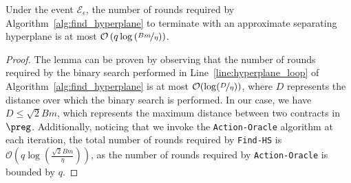 \begin{lemma}\label{lem:rounds_hyperplane}
	Under the event $\mathcal{E}_\epsilon$, the number of rounds required by Algorithm~\ref{alg:find_hyperplane} to terminate with an approximate separating hyperplane is at most $\mathcal{O}\left(q \log \left(\nicefrac{Bm}{\eta}\right)\right)$.
\end{lemma}
%
\begin{proof}
	The lemma can be proven by observing that the number of rounds required by the binary search performed in Line~\ref{line:hyperplane_loop} of Algorithm~\ref{alg:find_hyperplane} is at most $\mathcal{O}(\log(\nicefrac{D}{\eta}))$, where $D$ represents the distance over which the binary search is performed. In our case, we have $D \leq \sqrt{2}Bm$, which represents the maximum distance between two contracts in $\preg$. Additionally, noticing that we invoke the \texttt{Action-Oracle} algorithm at each iteration, the total number of rounds required by \texttt{Find-HS} is $\mathcal{O}(q \log(\frac{\sqrt{2}Bm}{\eta}))$, as the number of rounds required by \texttt{Action-Oracle} is bounded by $q$.
\end{proof}
